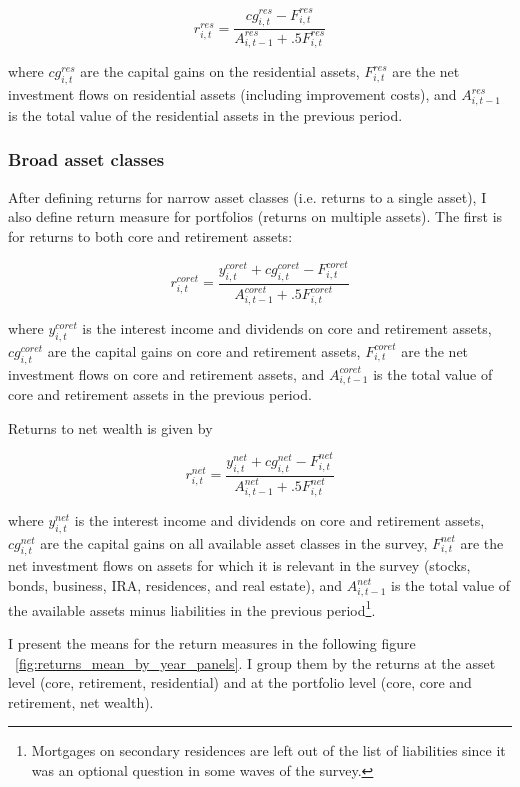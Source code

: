 $$ r^{res}_{i,t} = \frac{cg^{res}_{i,t} - F^{res}_{i,t}}{A^{res}_{i,t-1} + .5F^{res}_{i,t}}   $$

where  $cg^{res}_{i,t}$ are the capital gains on the residential assets, $F^{res}_{i,t}$ are the net investment flows on residential assets (including improvement costs), and $A^{res}_{i,t-1}$ is the total value of the residential assets in the previous period.

\subsubsection{Broad asset classes}

\par After defining returns for narrow asset classes (i.e. returns to a single asset), I also define return measure for portfolios (returns on multiple assets). The first is for returns to both core and retirement assets: 

$$ r^{coret}_{i,t} = \frac{y^{coret}_{i,t} + cg^{coret}_{i,t} - F^{coret}_{i,t}}{A^{coret}_{i,t-1} + .5F^{coret}_{i,t}}   $$

where $y^{coret}_{i,t}$ is the interest income and dividends on core and retirement assets, $cg^{coret}_{i,t}$ are the capital gains on core and retirement assets, $F^{coret}_{i,t}$ are the net investment flows on core and retirement assets, and $A^{coret}_{i,t-1}$ is the total value of core and retirement assets in the previous period.

\par Returns to net wealth is given by

$$ r^{net}_{i,t} = \frac{y^{net}_{i,t} + cg^{net}_{i,t} - F^{net}_{i,t}}{A^{net}_{i,t-1} + .5F^{net}_{i,t}}   $$

where $y^{net}_{i,t}$ is the interest income and dividends on core and retirement assets, $cg^{net}_{i,t}$ are the capital gains on all available asset classes in the survey, $F^{net}_{i,t}$ are the net investment flows on assets for which it is relevant in the survey (stocks, bonds, business, IRA, residences, and real estate), and $A^{net}_{i,t-1}$ is the total value of the available assets minus liabilities in the previous period\footnote{Mortgages on secondary residences are left out of the list of liabilities since it was an optional question in some waves of the survey.}.

\par I present the means for the return measures in the following figure ~\ref{fig:returns_mean_by_year_panels}. I group them by the returns at the asset level (core, retirement, residential) and at the portfolio level (core, core and retirement, net wealth). %

